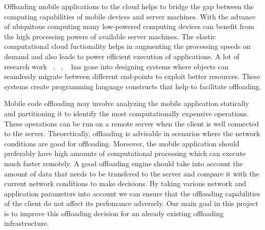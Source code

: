 Offloading mobile applications to the cloud helps to bridge the gap between the computing capabilities
of mobile devices and server machines. With the advance of ubiquitous computing many low-powered computing
devices can benefit from the high processing powers of available server machines. The elastic computational
cloud fuctionality helps in augmenting the processing speeds on demand and also leads to power efficient execution
of applications. A lot of research work ~\cite{netobj}, ~\cite{emerald}, ~\cite{tcl} has gone into designing systems where
objects can seamlessly migrate between different end-points to exploit better resources. These systems create
programming language constructs that help to facilitate offloading.

Mobile code offloading may involve analyzing the mobile application statically and partitioning it to identify the
most computationally expensive operations. These operations can be run on a remote server when the client is well
connected to the server. Theoretically, offloading is advisable in scenarios where the network conditions are good
for offloading. Moreover, the mobile application should preferably have high amounts of computational processing
which can execute much faster remotely. A good offloading engine should take into account the amount of data that
needs to be transfered to the server and compare it with the current network conditions to make decisions.
By taking various network and application parameters into account we can ensure that the offloading capabilities of the
client do not affect its perfomance adversely. Our main goal in this project is to improve this offloading
decision for an already existing offloading infrastructure.

